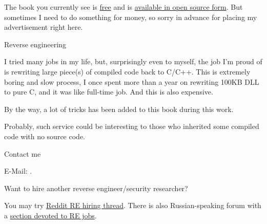 \vspace*{\fill}

\huge
\normalsize

\bigskip
\bigskip
\bigskip


The book you currently see is \href{http://beginners.re/}{free} and is \href{https://github.com/dennis714/RE-for-beginners/}{available in open source form}.
But sometimes I need to do something for money, so sorry in advance for placing my advertisement right here.

\Large Reverse engineering \normalsize

I tried many jobs in my life, but, surprisingly even to myself, the job I'm proud of is rewriting large piece(s) of compiled code back to C/C++.
This is extremely boring and slow process, I once spent more than a year on rewriting 100KB DLL to pure C, and it was like full-time job.
And this is also expensive.

By the way, a lot of tricks has been added to this book during this work.

Probably, such service could be interesting to those who inherited some compiled code with no source code.

\large Contact me \normalsize

E-Mail: \GTT{\EMAIL}.

\large Want to hire another reverse engineer/security researcher? \normalsize

You may try \href{https://www.reddit.com/r/ReverseEngineering/comments/5yt1je/rreverseengineerings_2016_triannual_hiring_thread/}{Reddit RE hiring thread}.
There is also Russian-speaking forum with a \href{https://forum.reverse4you.org/forumdisplay.php?f=252}{section devoted to RE jobs}.

\vspace*{\fill}
\vfill
